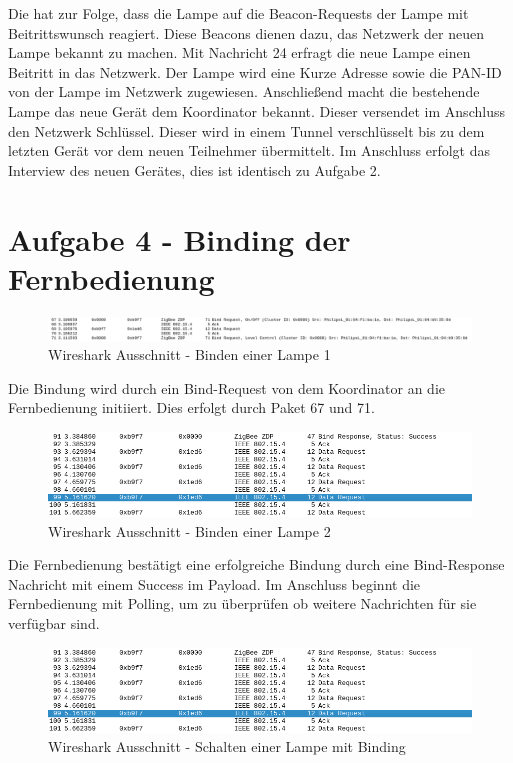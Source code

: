 Die hat zur Folge, dass die Lampe auf die Beacon-Requests der Lampe mit Beitrittswunsch reagiert. Diese Beacons dienen dazu, das Netzwerk der neuen Lampe bekannt zu machen.
Mit Nachricht 24 erfragt die neue Lampe einen Beitritt in das Netzwerk. Der Lampe wird eine Kurze Adresse sowie die PAN-ID von der Lampe im Netzwerk zugewiesen. Anschließend 
macht die bestehende Lampe das neue Gerät dem Koordinator bekannt. Dieser versendet im Anschluss den Netzwerk Schlüssel. Dieser wird in einem Tunnel verschlüsselt bis zu dem letzten
Gerät vor dem neuen Teilnehmer übermittelt. Im Anschluss erfolgt das Interview des neuen Gerätes, dies ist identisch zu Aufgabe 2.

\section{Aufgabe 4 - Binding der Fernbedienung}

\begin{figure}[H]
    \centering
    \includegraphics[width=1\textwidth]{media/lsg-4-1.png}
    \caption{Wireshark Ausschnitt - Binden einer Lampe 1}
\end{figure}

Die Bindung wird durch ein Bind-Request von dem Koordinator an die Fernbedienung initiiert. Dies erfolgt durch Paket 67 und 71.

\begin{figure}[H]
    \centering
    \includegraphics[width=1\textwidth]{media/lsg-4-2.png}
    \caption{Wireshark Ausschnitt - Binden einer Lampe 2}
\end{figure}

Die Fernbedienung bestätigt eine erfolgreiche Bindung durch eine Bind-Response Nachricht mit einem \grqq Success\grqq{} im Payload.
Im Anschluss beginnt die Fernbedienung mit Polling, um zu überprüfen ob weitere Nachrichten für sie verfügbar sind.

\begin{figure}[H]
    \centering
    \includegraphics[width=1\textwidth]{media/lsg-4-2.png}
    \caption{Wireshark Ausschnitt - Schalten einer Lampe mit Binding}
\end{figure}

